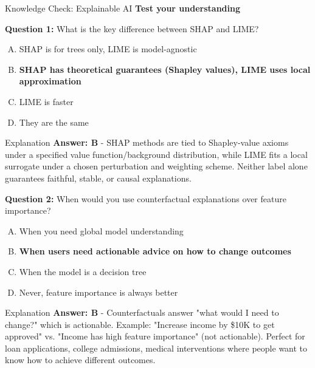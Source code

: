\begin{frame}{Knowledge Check: Explainable AI}
\textbf{Test your understanding}

\vspace{0.2cm}

\textbf{Question 1:} What is the key difference between SHAP and LIME?

\begin{enumerate}[A)]
\item SHAP is for trees only, LIME is model-agnostic
\item \textcolor{forest}{\textbf{SHAP has theoretical guarantees (Shapley values), LIME uses local approximation}}
\item LIME is faster
\item They are the same
\end{enumerate}

\pause

\begin{block}{Explanation}
\textcolor{forest}{\textbf{Answer: B}} - SHAP methods are tied to Shapley-value axioms under a specified value function/background distribution, while LIME fits a local surrogate under a chosen perturbation and weighting scheme. Neither label alone guarantees faithful, stable, or causal explanations.
\end{block}

\pause

\vspace{0.2cm}

\textbf{Question 2:} When would you use counterfactual explanations over feature importance?

\begin{enumerate}[A)]
\item When you need global model understanding
\item \textcolor{forest}{\textbf{When users need actionable advice on how to change outcomes}}
\item When the model is a decision tree
\item Never, feature importance is always better
\end{enumerate}

\pause

\begin{block}{Explanation}
\textcolor{forest}{\textbf{Answer: B}} - Counterfactuals answer "what would I need to change?" which is actionable. Example: "Increase income by \$10K to get approved" vs. "Income has high feature importance" (not actionable). Perfect for loan applications, college admissions, medical interventions where people want to know how to achieve different outcomes.
\end{block}
\end{frame}

